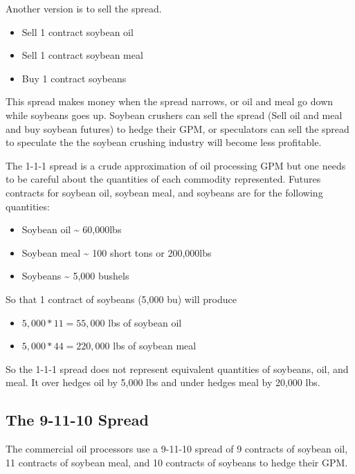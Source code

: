 \documentclass[
  letterpaper,
  DIV=11,
  numbers=noendperiod]{scrreprt}
\providecommand{\tightlist}{%
  \setlength{\itemsep}{0pt}\setlength{\parskip}{0pt}}\usepackage{longtable,booktabs,array}
\begin{document}
Another version is to sell the spread.

\begin{itemize}
\tightlist
\item
  Sell 1 contract soybean oil
\item
  Sell 1 contract soybean meal
\item
  Buy 1 contract soybeans
\end{itemize}

This spread makes money when the spread narrows, or oil and meal go down
while soybeans goes up. Soybean crushers can sell the spread (Sell oil
and meal and buy soybean futures) to hedge their GPM, or speculators can
sell the spread to speculate the the soybean crushing industry will
become less profitable.

The 1-1-1 spread is a crude approximation of oil processing GPM but one
needs to be careful about the quantities of each commodity represented.
Futures contracts for soybean oil, soybean meal, and soybeans are for
the following quantities:

\begin{itemize}
\tightlist
\item
  Soybean oil \textasciitilde{} 60,000lbs
\item
  Soybean meal \textasciitilde{} 100 short tons or 200,000lbs
\item
  Soybeans \textasciitilde{} 5,000 bushels
\end{itemize}

So that 1 contract of soybeans (5,000 bu) will produce

\begin{itemize}
\tightlist
\item
  \(5,000*11 = 55,000\) lbs of soybean oil
\item
  \(5,000*44 = 220,000\) lbs of soybean meal
\end{itemize}

So the 1-1-1 spread does not represent equivalent quantities of
soybeans, oil, and meal. It over hedges oil by 5,000 lbs and under
hedges meal by 20,000 lbs.

\subsection{The 9-11-10 Spread}\label{the-9-11-10-spread}

The commercial oil processors use a 9-11-10 spread of 9 contracts of
soybean oil, 11 contracts of soybean meal, and 10 contracts of soybeans
to hedge their GPM.
\end{document}
